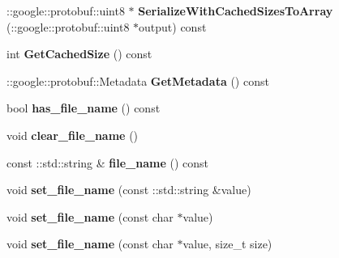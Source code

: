 \begin{DoxyCompactItemize}
\+::google\+::protobuf\+::uint8 $\ast$ {\bfseries Serialize\+With\+Cached\+Sizes\+To\+Array} (\+::google\+::protobuf\+::uint8 $\ast$output) const
\item 
\mbox{\label{classcaffe_1_1_h_d_f5_output_parameter_a35f800c9f7d53afa205e7c49917d943e}} 
int {\bfseries Get\+Cached\+Size} () const
\item 
\mbox{\label{classcaffe_1_1_h_d_f5_output_parameter_a5df71c9d341b6d30656e8fbbcc3fef4e}} 
\+::google\+::protobuf\+::\+Metadata {\bfseries Get\+Metadata} () const
\item 
\mbox{\label{classcaffe_1_1_h_d_f5_output_parameter_ae0395af33c645bd06342b0dbeb12cefb}} 
bool {\bfseries has\+\_\+file\+\_\+name} () const
\item 
\mbox{\label{classcaffe_1_1_h_d_f5_output_parameter_a5d926394ad0499aa541005cbb569e0ba}} 
void {\bfseries clear\+\_\+file\+\_\+name} ()
\item 
\mbox{\label{classcaffe_1_1_h_d_f5_output_parameter_a0564c5f0fba516f6bddfa57c7e9deb66}} 
const \+::std\+::string \& {\bfseries file\+\_\+name} () const
\item 
\mbox{\label{classcaffe_1_1_h_d_f5_output_parameter_aeb53aaabf14418c57fcea1064e4ea5a7}} 
void {\bfseries set\+\_\+file\+\_\+name} (const \+::std\+::string \&value)
\item 
\mbox{\label{classcaffe_1_1_h_d_f5_output_parameter_a1acb8007e052a076cc9a1aa837f11068}} 
void {\bfseries set\+\_\+file\+\_\+name} (const char $\ast$value)
\item 
\mbox{\label{classcaffe_1_1_h_d_f5_output_parameter_a227527ca4dfef7d331d274255c53d001}} 
void {\bfseries set\+\_\+file\+\_\+name} (const char $\ast$value, size\+\_\+t size)
\item 
\mbox{\label{classcaffe_1_1_h_d_f5_output_parameter_a3adf8603c931e414614535fec3d2e429}} 

\end{DoxyCompactItemize}
